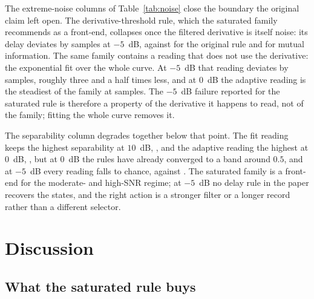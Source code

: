 \documentclass[10pt,a4paper,twocolumn]{article}
\begin{document}
The extreme-noise columns of Table~\ref{tab:noise} close the boundary the
original claim left open.  The derivative-threshold rule, which the saturated
family recommends as a front-end, collapses once the filtered derivative is
itself noise: its delay deviates by \devLowLPF{} samples at $-5$~dB, against
\devLowSE{} for the original rule and \devLowMI{} for mutual information.  The
same family contains a reading that does not use the derivative: the
exponential fit over the whole curve.  At $-5$~dB that reading deviates by
\devLowFIT{} samples, roughly three and a half times less, and at $0$~dB the
adaptive reading is the steadiest of the family at \devZeroADP{} samples.  The
$-5$~dB failure reported for the saturated rule is therefore a property of the
derivative it happens to read, not of the family; fitting the whole curve
removes it.

The separability column degrades together below that point.  The fit reading
keeps the highest separability at $10$~dB, \sepTenFIT{}, and the adaptive
reading the highest at $0$~dB, \sepZeroADP{}, but at $0$~dB the rules have
already converged to a band around $0.5$, and at $-5$~dB every reading falls
to chance, \sepLowFIT{} against \sepLowLPF{}.  The saturated family is a
front-end for the moderate- and high-SNR regime; at $-5$~dB no delay rule in
the paper recovers the states, and the right action is a stronger filter or a
longer record rather than a different selector.

\begin{table}[t]
\centering
\caption{Extreme additive noise, per delay rule.  ``dev'' is the mean absolute
rotor delay deviation from the clean delay (samples); ``sep'' is the
hypergraph separability at n-per-class $=12$, three seeds.  The
derivative-threshold rule collapses at $-5$~dB while the non-derivative
exponential-fit reading of the same family does not.}
\label{tab:noise}
\scriptsize

\end{table}

\section{Discussion}
\label{sec:disc}

\subsection{What the saturated rule buys}
\end{document}
